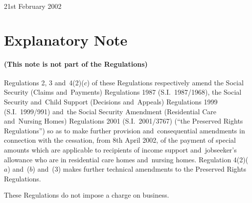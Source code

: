 \documentclass[12pt,a4paper]{article}
\begin{document}
21st February 2002

\small

\part{Explanatory Note}

\renewcommand\parthead{— Explanatory Note}

\subsection*{(This note is not part of the Regulations)}

Regulations 2, 3 and~4(2)($c$)  of these Regulations respectively amend the Social Security (Claims and~Payments) Regulations 1987 (S.I.~1987/1968), the Social Security and~Child Support (Decisions and~Appeals) Regulations 1999 (S.I.~1999/991) and~the Social Security Amendment (Residential Care and~Nursing Homes) Regulations 2001 (S.I.~2001/3767) (“the Preserved Rights Regulations”) so as to make further provision and~consequential amendments in connection with the cessation, from 8th April 2002, of the payment of special amounts which are applicable to recipients of income support and~jobseeker’s allowance who are in residential care homes and~nursing homes. Regulation 4(2)($a$)  and~($b$)  and~(3) makes further technical amendments to the Preserved Rights Regulations.

These Regulations do not impose a charge on business. 
\end{document}
